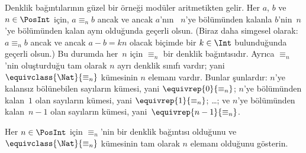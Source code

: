 \documentclass[../../../include/open-logic-section]{subfiles}
\begin{document}
\begin{ex}
Denklik bağıntılarının güzel bir örneği modüler aritmetikten gelir. Her
$a$, $b$ ve $n \in \PosInt$ için, $a \equiv_n b$ ancak ve ancak $a$'nın
~$n$'ye bölümünden kalanla $b$'nin~$n$'ye bölümünden kalan aynı olduğunda
geçerli olsun. (Biraz daha simgesel olarak: $a \equiv_n b$ ancak ve ancak
$a-b=kn$ olacak biçimde bir $k \in \Int$ bulunduğunda geçerli olsun.) Bu
durumda her~$n$ için $\equiv_n$ bir denklik
bağıntısıdır. Ayrıca $\equiv_n$'nin oluşturduğu tam olarak $n$ ayrı denklik
sınıfı vardır; yani $\equivclass{\Nat}{\equiv_n}$ kümesinin $n$ elemanı vardır.
Bunlar şunlardır: $n$'ye kalansız bölünebilen sayıların kümesi, yani
$\equivrep{0}{\equiv_n}$; $n$'ye bölümünden kalan~$1$ olan sayıların kümesi,
yani $\equivrep{1}{\equiv_n}$; \ldots; ve $n$'ye bölümünden kalan~$n-1$ olan
sayıların kümesi, yani~$\equivrep{n-1}{\equiv_n}$.
\end{ex}

\begin{prob}
Her $n \in \PosInt$ için $\equiv_n$'nin bir denklik bağıntısı olduğunu ve
$\equivclass{\Nat}{\equiv_n}$ kümesinin tam olarak $n$ elemanı olduğunu
gösterin.
\end{prob}
\end{document}
